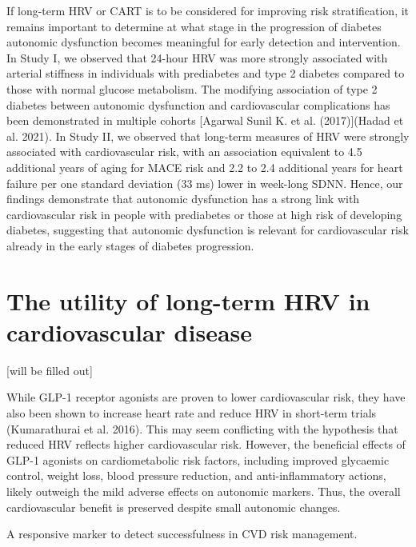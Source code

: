 \documentclass[
  a4paper,
  headsepline=true,
  open=any]{scrbook}
\begin{document}
If long-term HRV or CART is to be considered for improving risk
stratification, it remains important to determine at what stage in the
progression of diabetes autonomic dysfunction becomes meaningful for
early detection and intervention. In Study I, we observed that 24-hour
HRV was more strongly associated with arterial stiffness in individuals
with prediabetes and type 2 diabetes compared to those with normal
glucose metabolism. The modifying association of type 2 diabetes between
autonomic dysfunction and cardiovascular complications has been
demonstrated in multiple cohorts {[}Agarwal Sunil K. et al.
(2017){]}(Hadad et al. 2021). In Study II, we observed that long-term
measures of HRV were strongly associated with cardiovascular risk, with
an association equivalent to 4.5 additional years of aging for MACE risk
and 2.2 to 2.4 additional years for heart failure per one standard
deviation (33 ms) lower in week-long SDNN. Hence, our findings
demonstrate that autonomic dysfunction has a strong link with
cardiovascular risk in people with prediabetes or those at high risk of
developing diabetes, suggesting that autonomic dysfunction is relevant
for cardiovascular risk already in the early stages of diabetes
progression.


\hypertarget{the-utility-of-long-term-hrv-in-cardiovascular-disease}{%
\chapter{The utility of long-term HRV in cardiovascular
disease}\label{the-utility-of-long-term-hrv-in-cardiovascular-disease}}

{[}will be filled out{]}

While GLP-1 receptor agonists are proven to lower cardiovascular risk,
they have also been shown to increase heart rate and reduce HRV in
short-term trials (Kumarathurai et al. 2016). This may seem conflicting
with the hypothesis that reduced HRV reflects higher cardiovascular
risk. However, the beneficial effects of GLP-1 agonists on
cardiometabolic risk factors, including improved glycaemic control,
weight loss, blood pressure reduction, and anti-inflammatory actions,
likely outweigh the mild adverse effects on autonomic markers. Thus, the
overall cardiovascular benefit is preserved despite small autonomic
changes.

A responsive marker to detect successfulness in CVD risk management.

\end{document}
